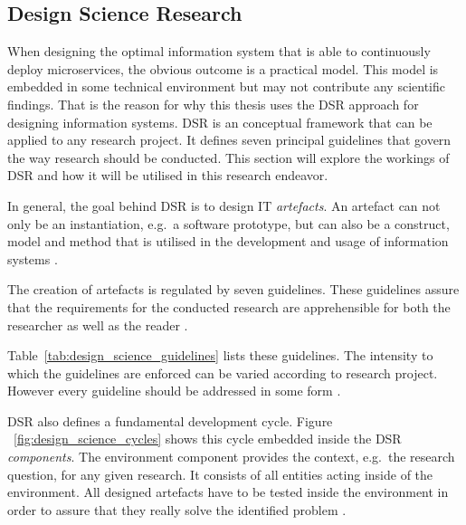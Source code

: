 
\subsection{Design Science Research}%
\label{sec:Design_Science_Research}

When designing the optimal information system that is able to continuously
deploy microservices, the obvious outcome is a practical model. This model is
embedded in some technical environment but may not contribute any scientific
findings. That is the reason for why this thesis uses the \ac{DSR} approach for
designing information systems. \ac{DSR} is an conceptual framework that can be
applied to any research project. It defines seven principal guidelines that
govern the way research should be conducted. This section will explore the
workings of \ac{DSR} and how it will be utilised in this research endeavor.

In general, the goal behind \ac{DSR} is to design \ac{IT} \textit{artefacts}.
An artefact can not only be an instantiation, e.g.\ a software prototype, but
can also be a construct, model and method that is utilised in the development
and usage of information systems \autocite[p.
82]{VonAlanDesignscienceinformation2004}.

The creation of artefacts is regulated by seven guidelines. These guidelines
assure that the requirements for the conducted research are apprehensible for
both the researcher as well as the reader \autocite[p.
82]{VonAlanDesignscienceinformation2004}.


Table~\ref{tab:design_science_guidelines} lists these guidelines. The intensity
to which the guidelines are enforced can be varied according to research
project.  However every guideline should be addressed in some form \autocite[p.
82]{VonAlanDesignscienceinformation2004}. 

\ac{DSR} also defines a fundamental development cycle. Figure
~\ref{fig:design_science_cycles} shows this cycle embedded inside the \ac{DSR}
\textit{components}. The environment component provides the context, e.g.\ the
research question, for any given research. It consists of all entities acting
inside of the environment. All designed artefacts have to be tested inside the
environment in order to assure that they really solve the identified problem
\autocite[p. 89]{HevnerThreeCycleView2007}.

